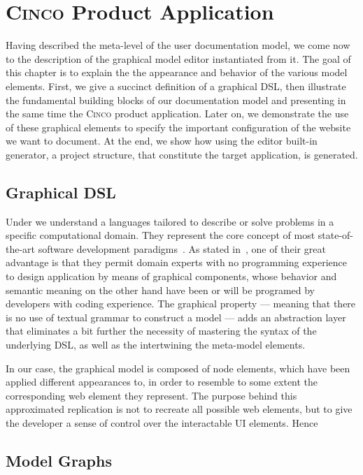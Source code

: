 \chapter{\textsc{Cinco} Product Application}\label{ch:CP}

Having described the meta-level of the user documentation model, we come now to the description of the graphical model editor instantiated from it. The goal of this chapter is to explain the the appearance and behavior of the various model elements. First, we give a succinct definition of a graphical DSL, then illustrate the fundamental building blocks of our documentation model and presenting in the same time the \textsc{Cinco} product application. Later on, we demonstrate the use of these graphical elements to specify the important configuration of the website we want to document. At the end, we show how using the editor built-in generator, a project structure, that constitute the target application, is generated.

\section{Graphical DSL}\label{sec:gDSL}

Under  we understand a languages tailored to describe or solve problems in a specific computational domain. They represent the core concept of most state-of-the-art software development paradigms~\cite{perez-et_al}. As stated in~\cite{Naujokat2018}, one of their great advantage is that they permit domain experts with no programming experience to design application by means of graphical components, whose behavior and semantic meaning on the other hand have been or will be programed by developers with coding experience. The graphical property --- meaning that there is no use of textual grammar to construct a model --- adds an abstraction layer that eliminates a bit further the necessity of mastering the syntax of the underlying DSL, as well as the  intertwining the meta-model elements.

In our case, the graphical model is composed of node elements, which have been applied different appearances to, in order to resemble to some extent the corresponding web element they represent. The purpose behind this approximated replication is not to recreate all possible web elements, but to give the developer a sense of control over the interactable UI elements. Hence

\section{Model Graphs}\label{sec:ModElem}

